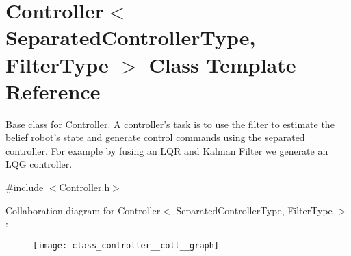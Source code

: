 \hypertarget{class_controller}{\section{\-Controller$<$ \-Separated\-Controller\-Type, \-Filter\-Type $>$ \-Class \-Template \-Reference}
\label{class_controller}
}


\-Base class for \hyperlink{class_controller}{\-Controller}. \-A controller's task is to use the filter to estimate the belief robot's state and generate control commands using the separated controller. \-For example by fusing an \-L\-Q\-R and \-Kalman \-Filter we generate an \-L\-Q\-G controller.  




{\ttfamily \#include $<$\-Controller.\-h$>$}



\-Collaboration diagram for \-Controller$<$ \-Separated\-Controller\-Type, \-Filter\-Type $>$\-:\nopagebreak
\begin{figure}[H]
\begin{center}
\leavevmode
\texttt{[image: class\_controller\_\_coll\_\_graph]}
\end{center}
\end{figure}
